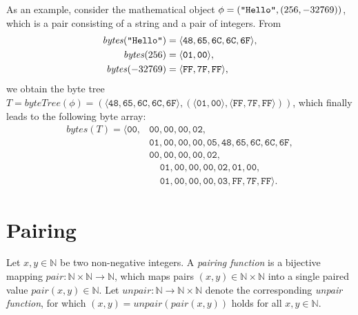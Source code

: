 \documentclass[bibtotoc,halfparskip,oneside]{scrreprt}
\newcommand{\hex}[1]{\ensuremath{\mathtt{#1}}}
\newcommand{\str}[1]{\ensuremath{\text{\texttt{"#1"}}}}
\begin{document}
	As an example, consider the mathematical object $\phi=(\str{Hello},(256, -32769))$, which is a pair consisting of a string and a pair of integers. From
	\begin{align*}
		\mathit{bytes}(\str{Hello})&=\langle\hex{48},\hex{65},\hex{6C},\hex{6C},\hex{6F}\rangle,\\
		\mathit{bytes}(256)&=\langle\hex{01},\hex{00}\rangle,\\
		\mathit{bytes}(-32769)&=\langle\hex{FF},\hex{7F},\hex{FF}\rangle,
	\end{align*}
	we obtain the byte tree $T=\mathit{byteTree}(\phi)=(\langle\hex{48},\hex{65},\hex{6C},\hex{6C},\hex{6F}\rangle,(\langle\hex{01},\hex{00}\rangle,\langle\hex{FF},\hex{7F},\hex{FF}\rangle))$, which finally leads to the following byte array:
	\begin{align*}
		\mathit{bytes}(T)=\langle\hex{00},&\hex{00},\hex{00},\hex{00},\hex{02},\\
		&\hex{01},\hex{00},\hex{00},\hex{00},\hex{05},\hex{48},\hex{65},\hex{6C},\hex{6C},\hex{6F},\\
		&\hex{00},\hex{00},\hex{00},\hex{00},\hex{02},\\
		&~~~~~\!\hex{01},\hex{00},\hex{00},\hex{00},\hex{02},\hex{01},\hex{00},\\
		&~~~~~\!\hex{01},\hex{00},\hex{00},\hex{00},\hex{03},\hex{FF},\hex{7F},\hex{FF}\rangle.
	\end{align*}
	\section{Pairing}
	
	Let $x,y\in \mathbb{N}$ be two non-negative integers. A \emph{pairing function} is a bijective mapping $\mathit{pair}:\mathbb{N}\times\mathbb{N}\rightarrow\mathbb{N}$, which maps pairs $(x,y)\in\mathbb{N}\times\mathbb{N}$ into a single paired value $\mathit{pair}(x,y)\in\mathbb{N}$. Let $\mathit{unpair}:\mathbb{N}\rightarrow\mathbb{N}\times\mathbb{N}$ denote the corresponding \emph{unpair function}, for which $(x,y)=\mathit{unpair}(\mathit{pair}(x,y))$ holds for all $x,y\in \mathbb{N}$.
	
\end{document}
